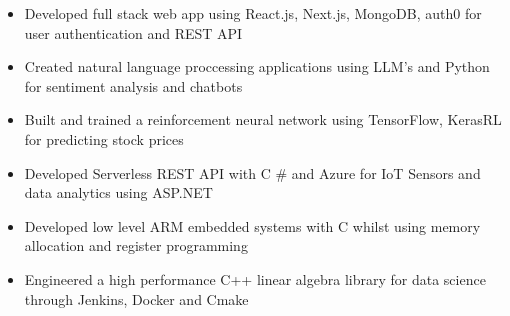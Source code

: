 \documentclass[11pt,a4paper,ragged2e]{altacv}
\begin{document}
\begin{paracol}{1}
\begin{itemize}
\item Developed full stack web app using React.js, Next.js, MongoDB, auth0 for user authentication and REST API
\item Created natural language proccessing applications using LLM's and Python for sentiment analysis and chatbots
\item Built and trained a reinforcement neural network using TensorFlow, KerasRL for predicting stock prices
\item  Developed Serverless REST API with C \# and Azure for IoT Sensors and data analytics using ASP.NET 
\item Developed low level ARM embedded systems with C whilst using memory allocation and register programming
\item Engineered a high performance C++ linear algebra library for data science through Jenkins, Docker and Cmake
\end{itemize}
\tightdivider


\end{paracol}
\end{document}
